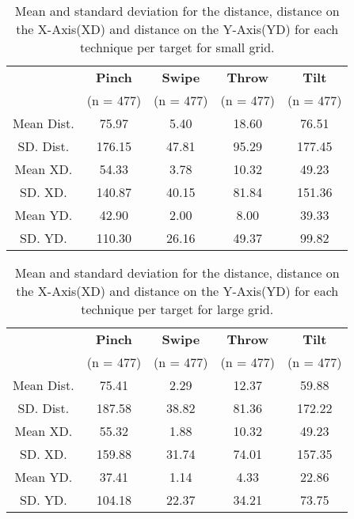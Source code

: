 \begin{table}[H]
	\centering
	\begin{tabular}{|c|c|c|c|c|}
		\hline
		\rowcolor[HTML]{9B9B9B} 
		& \textbf{Pinch} & \textbf{Swipe} & \textbf{Throw} & \textbf{Tilt} \\
		\rowcolor[HTML]{9B9B9B} 
		& (n = 477) & (n = 477) & (n = 477) & (n = 477) \\ \hline
		Mean Dist. & 75.97 & 5.40 & 18.60          & 76.51         \\ \hline
		SD. Dist. & 176.15 & 47.81 & 95.29 & 177.45 \\ \hline
		Mean XD. & 54.33 & 3.78 & 10.32 & 49.23 \\ \hline
		SD. XD. & 140.87 & 40.15 & 81.84 & 151.36 \\ \hline
		Mean YD. & 42.90 & 2.00 & 8.00 & 39.33 \\ \hline
		SD. YD. & 110.30 & 26.16 & 49.37 & 99.82 \\ \hline
	\end{tabular}
	\caption{Mean and standard deviation for the distance, distance on the X-Axis(XD) and distance on the Y-Axis(YD) for each technique per target for small grid.}
	\label{tab:distanceSmall}
\end{table}

\begin{table}[H]
	\centering
	\begin{tabular}{|c|c|c|c|c|}
		\hline
		\rowcolor[HTML]{9B9B9B} 
		& \textbf{Pinch} & \textbf{Swipe} & \textbf{Throw} & \textbf{Tilt} \\
		\rowcolor[HTML]{9B9B9B} 
		& (n = 477) & (n = 477) & (n = 477) & (n = 477) \\ \hline
		Mean Dist. & 75.41 & 2.29 & 12.37 & 59.88         \\ \hline
		SD. Dist. & 187.58 & 38.82 & 81.36 & 172.22 \\ \hline
		Mean XD. & 55.32 & 1.88 & 10.32 & 49.23 \\ \hline
		SD. XD. & 159.88 & 31.74 & 74.01 & 157.35 \\ \hline
		Mean YD. & 37.41 & 1.14 & 4.33 & 22.86 \\ \hline
		SD. YD. & 104.18 & 22.37 & 34.21 & 73.75 \\ \hline
	\end{tabular}
	\caption{Mean and standard deviation for the distance, distance on the X-Axis(XD) and distance on the Y-Axis(YD) for each technique per target for large grid.}
	\label{tab:distanceLarge}
\end{table} 

